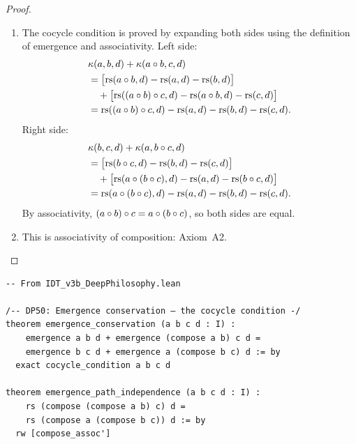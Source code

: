 \begin{proof}
\begin{enumerate}
\item The cocycle condition is proved by expanding both sides using the
  definition of emergence and associativity.  Left side:
  \begin{align*}
  &\kappa(a, b, d) + \kappa(a \circ b, c, d) \\
  &= \bigl[\mathrm{rs}(a \circ b, d) - \mathrm{rs}(a, d) - \mathrm{rs}(b, d)\bigr] \\
  &\quad+ \bigl[\mathrm{rs}((a \circ b) \circ c, d) -
    \mathrm{rs}(a \circ b, d) - \mathrm{rs}(c, d)\bigr] \\
  &= \mathrm{rs}((a \circ b) \circ c, d) - \mathrm{rs}(a, d) - \mathrm{rs}(b, d) - \mathrm{rs}(c, d).
  \end{align*}
  Right side:
  \begin{align*}
  &\kappa(b, c, d) + \kappa(a, b \circ c, d) \\
  &= \bigl[\mathrm{rs}(b \circ c, d) - \mathrm{rs}(b, d) - \mathrm{rs}(c, d)\bigr] \\
  &\quad+ \bigl[\mathrm{rs}(a \circ (b \circ c), d) -
    \mathrm{rs}(a, d) - \mathrm{rs}(b \circ c, d)\bigr] \\
  &= \mathrm{rs}(a \circ (b \circ c), d) - \mathrm{rs}(a, d) - \mathrm{rs}(b, d) - \mathrm{rs}(c, d).
  \end{align*}
  By associativity, $(a \circ b) \circ c = a \circ (b \circ c)$,
  so both sides are equal.

\item This is associativity of composition: Axiom~A2.
\end{enumerate}
\end{proof}

\begin{lstlisting}
-- From IDT_v3b_DeepPhilosophy.lean

/-- DP50: Emergence conservation — the cocycle condition -/
theorem emergence_conservation (a b c d : I) :
    emergence a b d + emergence (compose a b) c d =
    emergence b c d + emergence a (compose b c) d := by
  exact cocycle_condition a b c d

theorem emergence_path_independence (a b c d : I) :
    rs (compose (compose a b) c) d =
    rs (compose a (compose b c)) d := by
  rw [compose_assoc']
\end{lstlisting}

